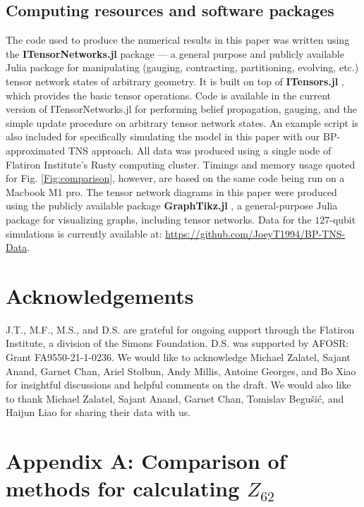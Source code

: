 \documentclass[%
 superscriptaddress,
 amsmath,amssymb,
 prx, nofootinbib,
 twocolumn
]{revtex4-2}
\begin{document}
\subsection*{Computing resources and software packages}
\label{Subsec:ComputingResources}
The code used to produce the numerical results in this paper was written using the \textbf{ITensorNetworks.jl} package \cite{ITensorNetworks} --- a general purpose and publicly available Julia \cite{bezanson2017julia} package for manipulating (gauging, contracting, partitioning, evolving, etc.) tensor network states of arbitrary geometry. It is built on top of \textbf{ITensors.jl} \cite{itensor-r0.3}, which provides the basic tensor operations. 
Code is available in the current version of ITensorNetworks.jl for performing belief propagation, gauging, and the simple update procedure on arbitrary tensor network states. An example script is also included for specifically simulating the model in this paper with our BP-approximated TNS approach.
All data was produced using a single node of Flatiron Institute's Rusty computing cluster. Timings and memory usage quoted for Fig. \ref{Fig:comparison}, however, are based on the same code being run on a Macbook M1 pro. The tensor network diagrams in this paper were produced using the publicly available package \textbf{GraphTikz.jl} \cite{GraphTikz}, a general-purpose Julia package for visualizing graphs, including tensor networks. Data for the $127$-qubit simulations is currently available at: \href{https://github.com/JoeyT1994/BP-TNS-Data}{https://github.com/JoeyT1994/BP-TNS-Data}.

\section*{Acknowledgements}
J.T., M.F., M.S., and D.S. are grateful for ongoing support through the Flatiron Institute, a division of the Simons Foundation. D.S. was supported by AFOSR: Grant FA9550-21-1-0236. We would like to acknowledge Michael Zalatel, Sajant Anand, Garnet Chan, Ariel Stolbun, Andy Millis, Antoine Georges, and Bo Xiao for insightful discussions and helpful comments on the draft. We would also like to thank Michael Zalatel, Sajant Anand, Garnet Chan, Tomislav Begušić, and Haijun Liao for sharing their data with us. 

\renewcommand{\theequation}{A\arabic{equation}}
\setcounter{equation}{0} 

\section{Appendix A: Comparison of methods for calculating $Z_{62}$}
\label{Subsec:Comparison}
\end{document}

